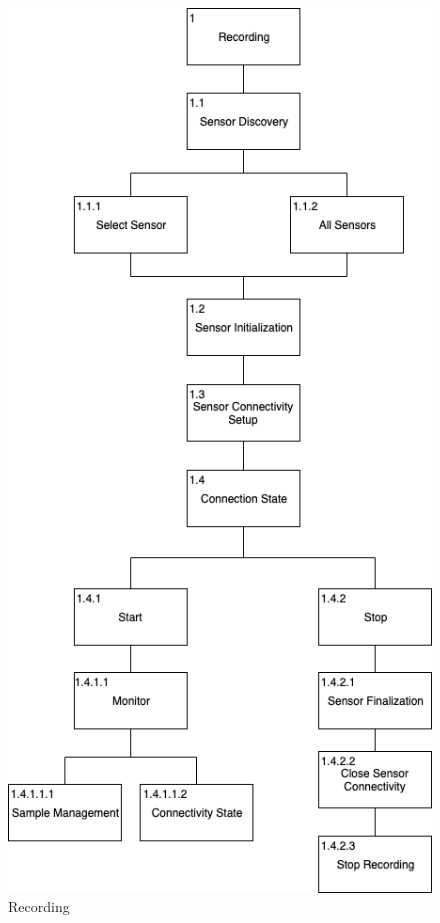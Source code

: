 \begin{figure}
    \centering
    \includegraphics[scale=0.5]{images/Recording.png}
    \caption{Recording}
    \label{fig:hta_recording}
\end{figure}

